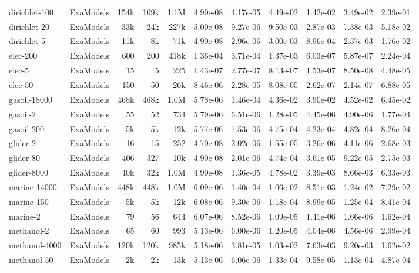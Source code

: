 {\begin{longtable}{@{}ll rrr rrr rr r@{}}
  dirichlet-100 & ExaModels & 154k & 109k & 1.1M & 4.90e-08 & 4.17e-05 & 4.49e-02 & 1.42e-02 & 3.49e-02 & 2.39e-01 \\
  dirichlet-20 & ExaModels & 33k & 24k & 227k & 5.00e-08 & 9.27e-06 & 9.50e-03 & 2.87e-03 & 7.38e-03 & 5.18e-02 \\
  dirichlet-5 & ExaModels & 11k & 8k & 71k & 4.90e-08 & 2.96e-06 & 3.00e-03 & 8.96e-04 & 2.37e-03 & 1.76e-02 \\
  elec-200 & ExaModels & 600 & 200 & 418k & 1.36e-04 & 3.71e-04 & 1.37e-03 & 6.03e-07 & 5.87e-07 & 2.24e-04 \\
  elec-5 & ExaModels & 15 & 5 & 225 & 1.43e-07 & 2.77e-07 & 8.13e-07 & 1.53e-07 & 8.50e-08 & 4.48e-05 \\
  elec-50 & ExaModels & 150 & 50 & 26k & 8.46e-06 & 2.28e-05 & 8.08e-05 & 2.62e-07 & 2.14e-07 & 6.88e-05 \\
  gasoil-18000 & ExaModels & 468k & 468k & 1.0M & 5.78e-06 & 1.46e-04 & 4.36e-02 & 3.90e-02 & 4.52e-02 & 6.45e-02 \\
  gasoil-2 & ExaModels & 55 & 52 & 734 & 5.79e-06 & 6.51e-06 & 1.28e-05 & 4.45e-06 & 4.90e-06 & 1.77e-04 \\
  gasoil-200 & ExaModels & 5k & 5k & 12k & 5.77e-06 & 7.53e-06 & 4.75e-04 & 4.23e-04 & 4.82e-04 & 8.26e-04 \\
  glider-2 & ExaModels & 16 & 15 & 252 & 4.70e-08 & 2.02e-06 & 1.55e-05 & 3.26e-06 & 4.11e-06 & 2.68e-03 \\
  glider-80 & ExaModels & 406 & 327 & 10k & 4.90e-08 & 2.01e-06 & 4.74e-04 & 3.61e-05 & 9.22e-05 & 2.75e-03 \\
  glider-8000 & ExaModels & 40k & 32k & 1.0M & 4.90e-08 & 1.36e-05 & 4.78e-02 & 3.39e-03 & 8.66e-03 & 6.33e-03 \\
  marine-14000 & ExaModels & 448k & 448k & 1.0M & 6.09e-06 & 1.40e-04 & 1.06e-02 & 8.51e-03 & 1.24e-02 & 7.29e-02 \\
  marine-150 & ExaModels & 5k & 5k & 12k & 6.08e-06 & 9.30e-06 & 1.18e-04 & 8.99e-05 & 1.25e-04 & 8.41e-04 \\
  marine-2 & ExaModels & 79 & 56 & 644 & 6.07e-06 & 8.52e-06 & 1.09e-05 & 1.41e-06 & 1.66e-06 & 1.62e-04 \\
  methanol-2 & ExaModels & 65 & 60 & 993 & 5.13e-06 & 6.00e-06 & 1.20e-05 & 4.04e-06 & 4.56e-06 & 2.99e-04 \\
  methanol-4000 & ExaModels & 120k & 120k & 985k & 5.18e-06 & 3.81e-05 & 1.03e-02 & 7.63e-03 & 9.20e-03 & 1.62e-02 \\
  methanol-50 & ExaModels & 2k & 2k & 13k & 5.13e-06 & 6.06e-06 & 1.33e-04 & 9.58e-05 & 1.13e-04 & 4.87e-04 \\

\end{longtable}}
